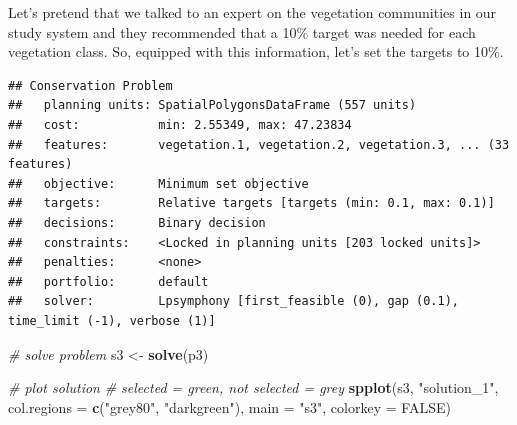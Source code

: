 \documentclass[12pt,]{book}
\newenvironment{Shaded}{\begin{snugshade}}{\end{snugshade}}
\newcommand{\KeywordTok}[1]{\textcolor[rgb]{0.13,0.29,0.53}{\textbf{#1}}}
\newcommand{\DataTypeTok}[1]{\textcolor[rgb]{0.13,0.29,0.53}{#1}}
\newcommand{\FloatTok}[1]{\textcolor[rgb]{0.00,0.00,0.81}{#1}}
\newcommand{\StringTok}[1]{\textcolor[rgb]{0.31,0.60,0.02}{#1}}
\newcommand{\CommentTok}[1]{\textcolor[rgb]{0.56,0.35,0.01}{\textit{#1}}}
\newcommand{\OtherTok}[1]{\textcolor[rgb]{0.56,0.35,0.01}{#1}}
\newcommand{\OperatorTok}[1]{\textcolor[rgb]{0.81,0.36,0.00}{\textbf{#1}}}
\newcommand{\NormalTok}[1]{#1}
\begin{document}
Let's pretend that we talked to an expert on the vegetation communities
in our study system and they recommended that a 10\% target was needed
for each vegetation class. So, equipped with this information, let's set
the targets to 10\%.

\begin{Shaded}
\end{Shaded}

\begin{verbatim}
## Conservation Problem
##   planning units: SpatialPolygonsDataFrame (557 units)
##   cost:           min: 2.55349, max: 47.23834
##   features:       vegetation.1, vegetation.2, vegetation.3, ... (33 features)
##   objective:      Minimum set objective 
##   targets:        Relative targets [targets (min: 0.1, max: 0.1)]
##   decisions:      Binary decision 
##   constraints:    <Locked in planning units [203 locked units]>
##   penalties:      <none>
##   portfolio:      default
##   solver:         Lpsymphony [first_feasible (0), gap (0.1), time_limit (-1), verbose (1)]
\end{verbatim}

\begin{Shaded}
\begin{Highlighting}[]
\CommentTok{# solve problem}
\NormalTok{s3 <-}\StringTok{ }\KeywordTok{solve}\NormalTok{(p3)}

\CommentTok{# plot solution}
\CommentTok{# selected = green, not selected = grey}
\KeywordTok{spplot}\NormalTok{(s3, }\StringTok{"solution_1"}\NormalTok{, }\DataTypeTok{col.regions =} \KeywordTok{c}\NormalTok{(}\StringTok{"grey80"}\NormalTok{, }\StringTok{"darkgreen"}\NormalTok{), }\DataTypeTok{main =} \StringTok{"s3"}\NormalTok{,}
       \DataTypeTok{colorkey =} \OtherTok{FALSE}\NormalTok{)}
\end{Highlighting}
\end{Shaded}
\end{document}
